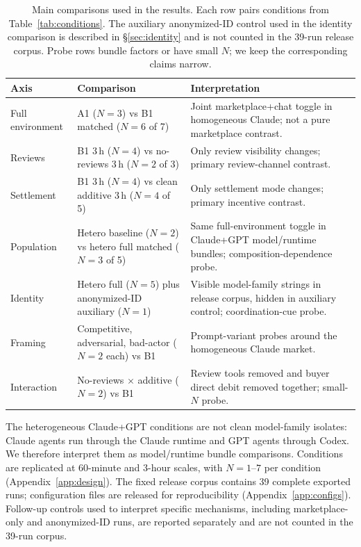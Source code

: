 \documentclass{article}
\begin{document}
\begin{table}[t]
    \centering
    \footnotesize
    \caption{Main comparisons used in the results. Each row pairs conditions from Table~\ref{tab:conditions}. The auxiliary anonymized-ID control used in the identity comparison is described in \S\ref{sec:identity} and is not counted in the 39-run release corpus. Probe rows bundle factors or have small $N$; we keep the corresponding claims narrow.}
    \label{tab:conditions-main}
    \setlength{\tabcolsep}{4pt}
    \begin{tabular}{@{}p{}p{}p{}@{}}
        \toprule
        Axis & Comparison & Interpretation \\
        \midrule
        Full environment & A1 ($N{=}3$) vs B1 matched ($N{=}6$ of 7) & Joint marketplace+chat toggle in homogeneous Claude; not a pure marketplace contrast. \\
        Reviews & B1 3\,h ($N{=}4$) vs no-reviews 3\,h ($N{=}2$ of 3) & Only review visibility changes; primary review-channel contrast. \\
        Settlement & B1 3\,h ($N{=}4$) vs clean additive 3\,h ($N{=}4$ of 5) & Only settlement mode changes; primary incentive contrast. \\
        Population & Hetero baseline ($N{=}2$) vs hetero full matched ($N{=}3$ of 5) & Same full-environment toggle in Claude+GPT model/runtime bundles; composition-dependence probe. \\
        Identity & Hetero full ($N{=}5$) plus anonymized-ID auxiliary ($N{=}1$) & Visible model-family strings in release corpus, hidden in auxiliary control; coordination-cue probe. \\
        Framing & Competitive, adversarial, bad-actor ($N{=}2$ each) vs B1 & Prompt-variant probes around the homogeneous Claude market. \\
        Interaction & No-reviews $\times$ additive ($N{=}2$) vs B1 & Review tools removed and buyer direct debit removed together; small-$N$ probe. \\
        \bottomrule
    \end{tabular}
\end{table}

The heterogeneous Claude+GPT conditions are not clean model-family isolates: Claude agents run through the Claude runtime and GPT agents through Codex.
We therefore interpret them as model/runtime bundle comparisons.
Conditions are replicated at 60-minute and 3-hour scales, with $N=1$--$7$ per condition (Appendix~\ref{app:design}).
The fixed release corpus contains 39 complete exported runs; configuration files are released for reproducibility (Appendix~\ref{app:configs}).
Follow-up controls used to interpret specific mechanisms, including marketplace-only and anonymized-ID runs, are reported separately and are not counted in the 39-run corpus.
\end{document}
